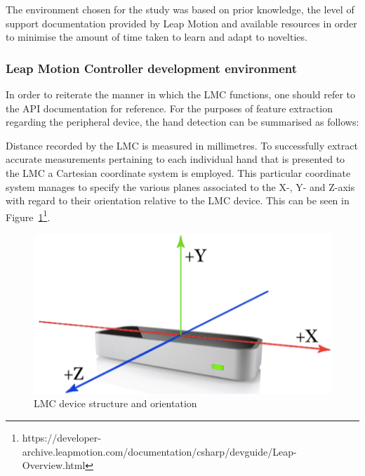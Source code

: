 The environment chosen for the study was based on prior knowledge, the level of support documentation provided by Leap Motion and available resources in order to minimise the amount of time taken to learn and adapt to novelties. 

\subsubsection{Leap Motion Controller development environment}

In order to reiterate the manner in which the LMC functions, one should refer to the API documentation for reference. For the purposes of feature extraction regarding the peripheral device, the hand detection can be summarised as follows:

Distance recorded by the LMC is measured in millimetres. 
To successfully extract accurate measurements pertaining to each individual hand that is presented to the LMC a Cartesian coordinate system is employed. 	This particular coordinate system manages to specify the various planes associated to the X-, Y- and Z-axis with regard to their orientation relative to the LMC device. This can be seen in Figure~\ref{fig:LMC device structure and orientation}\footnote{https://developer-archive.leapmotion.com/documentation/csharp/devguide/Leap-Overview.html}. 

    
    \begin{figure}[htbp!] 
    \centering    
    \includegraphics[width=1.0\textwidth]{Chapter3/Figs/Figure3-5.png}
    \caption[LMC device structure and orientation]{LMC device structure and orientation}
    \label{fig:LMC device structure and orientation}
    \end{figure}


